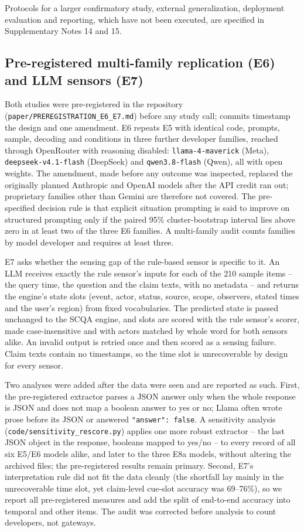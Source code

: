 Protocols for a larger confirmatory study, external generalization, deployment
evaluation and reporting, which have not been executed, are specified in
Supplementary Notes 14 and 15.

\subsection*{Pre-registered multi-family replication (E6) and LLM sensors (E7)}

Both studies were pre-registered in the repository
(\texttt{paper/PREREGISTRATION\_E6\_E7.md}) before any study call; commits
timestamp the design and one amendment. E6 repeats E5 with identical
code, prompts, sample, decoding and conditions in three further developer
families, reached through OpenRouter with reasoning disabled:
\texttt{llama-4-maverick} (Meta), \texttt{deepseek-v4.1-flash} (DeepSeek) and
\texttt{qwen3.8-flash} (Qwen), all with open weights. The amendment, made
before any outcome was inspected, replaced the originally planned Anthropic
and OpenAI models after the API credit ran out; proprietary families other
than Gemini are therefore not covered. The pre-specified decision rule is that
explicit situation prompting is said to improve on structured prompting only if
the paired 95\% cluster-bootstrap interval lies above zero in at least two of
the three E6 families. A multi-family audit counts families by model developer
and requires at least three.

E7 asks whether the sensing gap of the rule-based sensor is specific to it. An
LLM receives exactly the rule sensor's inputs for each of the 210 sample items
-- the query time, the question and the claim texts, with no metadata -- and
returns the engine's state slots (event, actor, status, source, scope,
observers, stated times and the user's region) from fixed vocabularies. The
predicted state is passed unchanged to the SCQA engine, and slots are scored
with the rule sensor's scorer, made case-insensitive and with actors matched by
whole word for both sensors alike. An invalid output is retried once and then
scored as a sensing failure. Claim texts contain no timestamps, so the time
slot is unrecoverable by design for every sensor.

Two analyses were added after the data were seen and are reported as such.
First, the pre-registered extractor parses a JSON answer only when the whole
response is JSON and does not map a boolean answer to yes or no; Llama often
wrote prose before its JSON or answered \texttt{"answer": false}. A
sensitivity analysis (\texttt{code/sensitivity\_rescore.py}) applies one more
robust extractor -- the last JSON object in the response, booleans mapped to
yes/no -- to every record of all six E5/E6 models alike, and later to the three
E8a models, without altering the
archived files; the pre-registered results remain primary. Second, E7's
interpretation rule did not fit the data cleanly (the shortfall lay mainly in
the unrecoverable time slot, yet claim-level cue-slot accuracy was 69--76\%),
so we report all pre-registered measures and add the split of end-to-end
accuracy into temporal and other items. The audit was corrected before analysis to count developers, not gateways.


